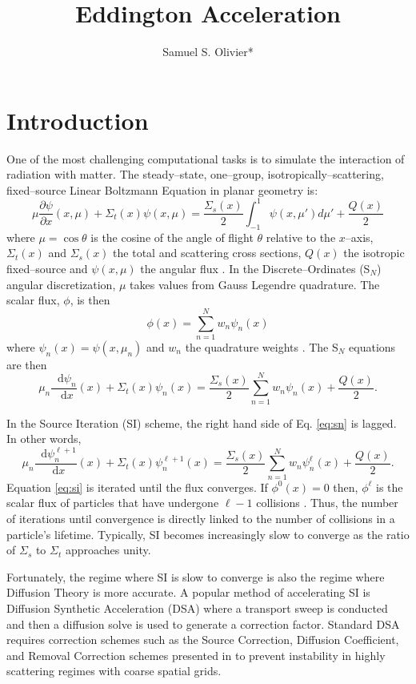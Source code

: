 \documentclass{anstrans}
\title{Eddington Acceleration}
\author{Samuel S. Olivier*}
\institute{Department of Nuclear Engineering, Texas A\&M University, College Station, TX 77843}
\newcommand{\SN}{S$_N$\xspace}
\newcommand{\ud}{\mathop{}\!\mathrm{d}} %
\newcommand{\pderiv}[2]{\frac{\partial #1}{\partial #2}}
\newcommand{\dderiv}[2]{\frac{\ud #1}{\ud #2}}
\begin{document}
\section{Introduction}
	One of the most challenging computational tasks is to simulate the interaction of radiation with matter. The steady--state, one--group, isotropically--scattering, fixed--source Linear Boltzmann Equation in planar geometry is: 
		\begin{equation} \label{eq:bte}
			\mu \pderiv{\psi}{x}(x, \mu) + \Sigma_t(x) \psi(x,\mu) = 
			\frac{\Sigma_s(x)}{2} \int_{-1}^{1} \psi(x, \mu') d\mu' + \frac{Q(x)}{2}
		\end{equation}
	where $\mu = \cos\theta$ is the cosine of the angle of flight $\theta$ relative to the $x$--axis, $\Sigma_t(x)$ and $\Sigma_s(x)$ the total and scattering cross sections, $Q(x)$ the isotropic fixed--source and $\psi(x, \mu)$ the angular flux \cite{adams}. In the Discrete--Ordinates (\SN) angular discretization, $\mu$ takes values from Gauss Legendre quadrature. The scalar flux, $\phi$, is then 
		\begin{equation} \label{eq:quad}
			\phi(x) = \sum_{n=1}^N w_n \psi_n(x)
		\end{equation}
	where $\psi_n(x) = \psi(x,\mu_n)$ and $w_n$ the quadrature weights \cite{llnl}. The \SN equations are then 
		\begin{equation} \label{eq:sn}
			\mu_n \dderiv{\psi_n}{x}(x) + \Sigma_t(x) \psi_n(x) = 
			\frac{\Sigma_s(x)}{2} \sum_{n=1}^N w_n \psi_n(x) + \frac{Q(x)}{2}. 
		\end{equation}

	In the Source Iteration (SI) scheme, the right hand side of Eq. \ref{eq:sn} is lagged. In other words, 
		\begin{equation} \label{eq:si}
			\mu_n \dderiv{\psi_n^{\ell+1}}{x}(x) + \Sigma_t(x) \psi_n^{\ell+1}(x) = 
			\frac{\Sigma_s(x)}{2} \sum_{n=1}^N w_n \psi_n^\ell(x) + \frac{Q(x)}{2}. 
		\end{equation}
	Equation \ref{eq:si} is iterated until the flux converges. If $\phi^0(x) = 0$ then, $\phi^\ell$ is the scalar flux of particles that have undergone $\ell - 1$ collisions \cite{adams}. Thus, the number of iterations until convergence is directly linked to the number of collisions in a particle's lifetime. Typically, SI becomes increasingly slow to converge as the ratio of $\Sigma_s$ to $\Sigma_t$ approaches unity. 

	Fortunately, the regime where SI is slow to converge is also the regime where Diffusion Theory is more accurate. A popular method of accelerating SI is Diffusion Synthetic Acceleration (DSA) where a transport sweep is conducted and then a diffusion solve is used to generate a correction factor. Standard DSA requires correction schemes such as the Source Correction, Diffusion Coefficient, and Removal Correction schemes presented in \cite{alcouffe} to prevent instability in highly scattering regimes with coarse spatial grids. 
\end{document}
